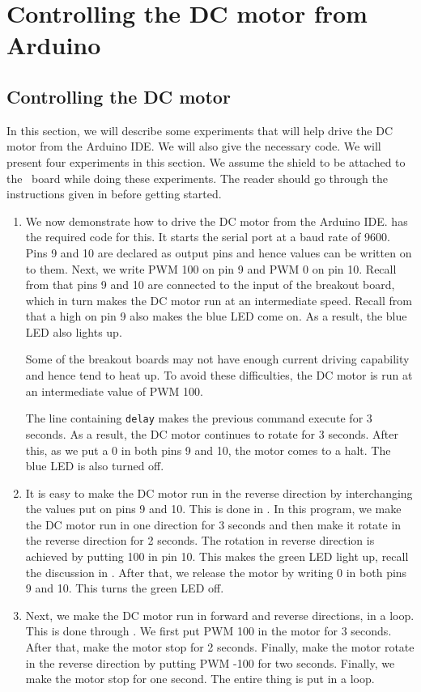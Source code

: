 \section{Controlling the DC motor from Arduino}
\subsection{Controlling the DC motor}
\label{sec:dcm-ard}
In this section, we will describe some experiments that will help
drive the DC motor from the Arduino IDE.  We will also give the
necessary code.  We will present four experiments in this section.  We
assume the shield to be attached to the \arduino\ board while doing
these experiments.  The reader should go through the instructions
given in  before getting started.
\begin{enumerate}
\item We now demonstrate how to drive the DC motor from the Arduino
  IDE.   has the required code for this.  It
  starts the serial port at a baud rate of 9600.  Pins 9 and 10 are
  declared as output pins and hence values can be written on to them.
  Next, we write PWM 100 on pin 9 and PWM 0 on pin 10.  Recall from
   that pins 9 and 10 are connected to the
  input of the breakout board, which in turn makes the DC motor run at
  an intermediate speed.  Recall from  that a
  high on pin 9 also makes the blue LED come on.  As a result, the
  blue LED also lights up.

  Some of the breakout boards may not have enough current driving
  capability and hence tend to heat up.  To avoid these difficulties,
  the DC motor is run at an intermediate value of PWM 100.

  The line containing {\tt delay} makes the previous command execute
  for 3 seconds.  As a result, the DC motor continues to rotate for 3
  seconds.  After this, as we put a 0 in both pins 9 and 10, the motor
  comes to a halt.  The blue LED is also turned off.

\item It is easy to make the DC motor run in the reverse direction by
  interchanging the values put on pins 9 and 10.  This is done in
  .  In this program, we make the DC motor
  run in one direction for 3 seconds and then make it rotate in the
  reverse direction for 2 seconds.  The rotation in reverse direction
  is achieved by putting 100 in pin 10.  This makes the green LED
  light up, recall the discussion in .  After
  that, we release the motor by writing 0 in both pins 9 and 10.  This
  turns the green LED off.

\item Next, we make the DC motor run in forward and reverse
  directions, in a loop.  This is done through
  .  We first put PWM 100 in the motor for 3
  seconds.  After that, make the motor stop for 2 seconds.  Finally,
  make the motor rotate in the reverse direction by putting PWM -100
  for two seconds.  Finally, we make the motor stop for one second.
  The entire thing is put in a loop.
\end{enumerate}


